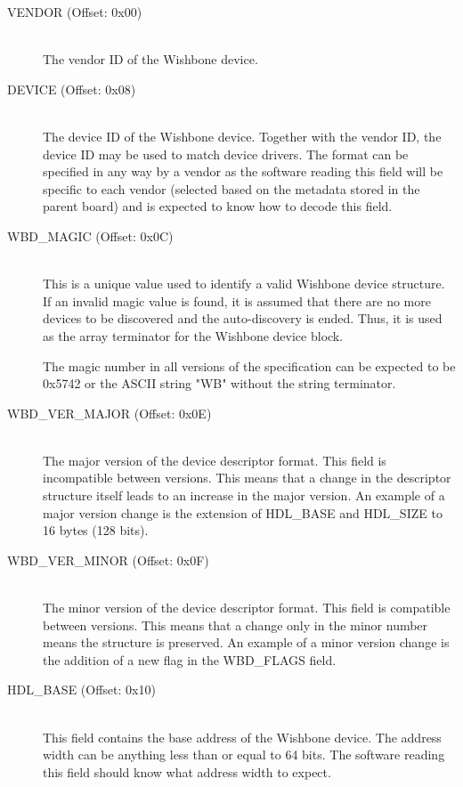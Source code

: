 \documentclass{article}
\begin{document}
\begin{description}
\item[VENDOR (Offset: 0x00)] \hfill \\
The vendor ID of the Wishbone device.

\item[DEVICE (Offset: 0x08)] \hfill \\
The device ID of the Wishbone device. Together with the vendor ID, the
device ID may be used to match device drivers. The format can be specified
in any way by a vendor as the software reading this field will be
specific to each vendor (selected based on the metadata stored in the
parent board) and is expected to know how to decode this field.

\item[WBD\_MAGIC (Offset: 0x0C)] \hfill \\
This is a unique value used to identify a valid Wishbone device structure. If
an invalid magic value is found, it is assumed that there are no more devices
to be discovered and the auto-discovery is ended. Thus, it is used as the array
terminator for the Wishbone device block.

The magic number in all versions of the specification can be expected to
be 0x5742 or the ASCII string "WB" without the string terminator.

\item[WBD\_VER\_MAJOR (Offset: 0x0E)] \hfill \\
The major version of the device descriptor format. This field is incompatible
between versions. This means that a change in the descriptor structure itself
leads to an increase in the major version. An example of a major version change
is the extension of HDL\_BASE and HDL\_SIZE to 16 bytes (128 bits).

\item[WBD\_VER\_MINOR (Offset: 0x0F)] \hfill \\
The minor version of the device descriptor format. This field is compatible
between versions. This means that a change only in the minor number means the
structure is preserved. An example of a minor version change is the addition
of a new flag in the WBD\_FLAGS field.

\item[HDL\_BASE (Offset: 0x10)] \hfill \\
This field contains the base address of the Wishbone device. The address width
can be anything less than or equal to 64 bits. The software reading this
field should know what address width to expect.


\end{description}
\end{document}
